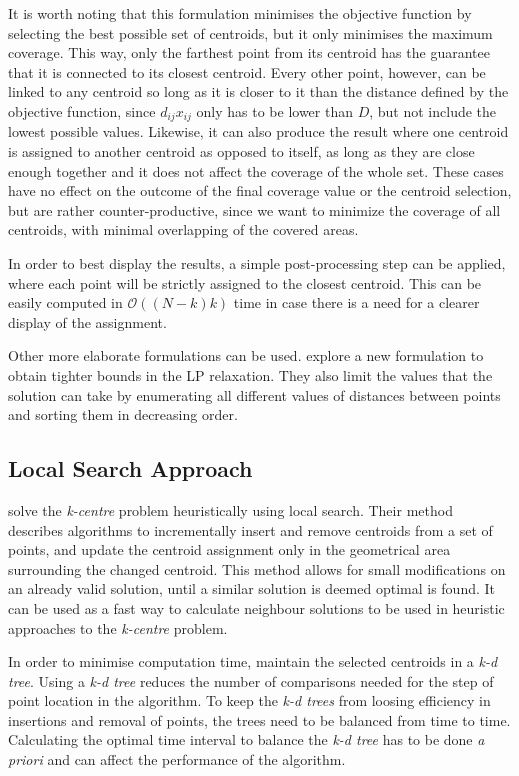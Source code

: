 It is worth noting that this formulation minimises the objective function by selecting the best possible set of centroids, but it only minimises the maximum coverage. This way, only the farthest point from its centroid has the guarantee that it is connected to its closest centroid.
Every other point, however, can be linked to any centroid so long as it is closer to it than the distance defined by the objective function, since $d_{ij}x_{ij}$ only has to be lower than $D$, but not include the lowest possible values.
Likewise, it can also produce the result where one centroid is assigned to another centroid as opposed to itself, as long as they are close enough together and it does not affect the coverage of the whole set.
These cases have no effect on the outcome of the final coverage value or the centroid selection, but are rather counter-productive, since we want to minimize the coverage of all centroids, with minimal overlapping of the covered areas.

In order to best display the results, a simple post-processing step can be applied, where each point will be strictly assigned to the closest centroid. This can be easily computed in $\mathcal{O}((N-k)k)$ time in case there is a need for a clearer display of the assignment.

Other more elaborate formulations can be used. \citet{linearprog} explore a new formulation to obtain tighter bounds in the LP relaxation. They also limit the values that the solution can take by enumerating all different values of distances between points and sorting them in decreasing order.

\subsection{Local Search Approach }
\citet{incrementalcov} solve the \emph{k-centre} problem heuristically using local search. Their method describes algorithms to incrementally insert and remove centroids from a set of points, and update the centroid assignment only in the geometrical area surrounding the changed centroid. This method allows for small modifications on an already valid solution, until a similar solution is deemed optimal is found. It can be used as a fast way to calculate neighbour solutions to be used in heuristic approaches to the \emph{k-centre} problem.

In order to minimise computation time, \citet{incrementalcov} maintain the selected centroids in a \emph{k-d tree}. Using a \emph{k-d tree} reduces the number of comparisons needed for the step of point location in the algorithm. To keep the \emph{k-d trees} from loosing efficiency in insertions and removal of points, the trees need to be balanced from time to time. Calculating the optimal time interval to balance the \emph{k-d tree} has to be done \emph{a priori} and can affect the performance of the algorithm.


